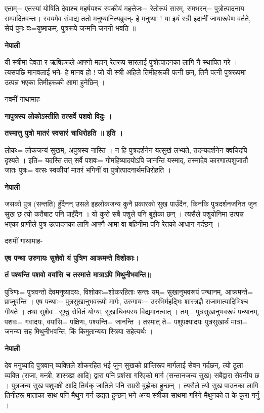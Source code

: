 \documentclass[11pt, a5paper]{article}
\begin{document}
एताम्= एतस्यां योषिति देवाश्च महर्षयश्च स्वकीयं महत्तेजः= रेतोरूपं सारम्, समभरन्= पुत्रोत्पादनाय सम्पादितवन्तः। स्वयमेव संपाद्य ततो मनुष्यानित्यब्रुवन्- हे मनुष्याः ! या इयं स्त्री इदानीं जायारूपेण वर्तते, सेयं पुनः वः=युष्माकम्, पुत्ररूपे जन्मनि जननी भवति ॥

\textbf{नेपाली}

यी स्त्रीमा देवता र ऋषिहरूले आफ्नो महान् रेतरूप सारलाई पुत्रोत्पादनका लागि नै स्थापित गरे । त्यसपछि मानवलाई भने- हे मानव हो ! जो यी स्त्री अहिले तिमीहरूकी पत्नी छन्, तिनै पत्नी पुत्ररूपमा उत्पन्न भएका तिमीहरूकी आमा हुनेछिन् ।

नवमीं गाथामाह-

\textbf{नापुत्रस्य लोकोऽस्तीति तत्सर्वे पशवो विदुः ।}

\textbf{तस्मात्तु पुत्रो मातरं स्वसारं चाधिरोहति ॥ इति ।}

लोकः= लोकजन्यं सुखम्, अपुत्रस्य नास्ति । न हि पुत्रदर्शनेन यत्सुखं लभ्यते, तदन्यदर्शनेन क्वचिदपि दृश्यते । इति= यदस्ति तत् सर्वे पशवः= गोमहिष्यादयोऽपि जानन्ति यस्माद्, तस्मादेव कारणात्पशुजातौ जातः पुत्रः= वत्सः स्वकीयां मातरं भगिनीं वा पुत्रोत्पादनार्थमधिरोहति ।

\textbf{नेपाली}

जसको पुत्र (सन्तति) हुँदैनन् उसले इहलोकजन्य कुनै प्रकारको सुख पाउँदैन, किनकि पुत्रदर्शनजनित जुन सुख छ त्यो कतैबाट पनि पाइँदैन । यो कुरो सबै पशुले पनि बुझेका छन् । त्यसैले पशुयोनिमा उत्पन्न भएका प्राणीले पुत्र उत्पादनका लागि आफ्नै आमा वा बहिनीमा पनि रेतको आधान गर्दछन् ।

दशमीं गाथामाह-

\textbf{एष पन्था उरुगायः सुशेवो यं पुत्रिण आक्रमन्ते विशोकाः।}

\textbf{तं पश्यन्ति पशवो वयांसि च तस्मात्ते मात्राऽपि मिथुनीभवन्ति॥}

पुत्रिणः= पुत्रवन्तो देवमनुष्यादयः, विशोकाः=शोकरहिताः सन्तः यम्= सुखानुभवरूपं पन्थानम्, आक्रमन्ते= प्राप्नुवन्ति । एष पन्थाः= पुत्रसुखानुभवरूपो मार्गः, उरुगायः= उरुभिर्महद्भिः शास्त्रज्ञै राजामात्यादिभिश्च गीयते । तथा सुशेवः=सुष्ठु सेवितं योग्यः, सुखाधिक्यस्य विद्यमानत्वात् । तम्= पुत्रसुखानुभवरूपं पन्थानम्, पशवः= गवादयः, वयांसि= पक्षिणः, पश्यन्ति= जानन्ति । तस्मात् ते= पशुपक्ष्यादयः पुत्रसुखार्थं मात्रा= जनन्या सह मिथुनीभवन्ति, किं किमुतान्यया स्त्रिया सहेत्यर्थः ।

\textbf{नेपाली}

देव मनुष्यादि पुत्रवान् व्यक्तिले शोकरहित भई जुन सुखको प्राप्तिरूप मार्गलाई सेवन गर्दछन्, त्यो ठूला व्यक्ति (राजा, मन्त्री, शास्त्रज्ञ आदि) द्वारा पनि प्रशंसा गरिएको मार्ग (सन्तानजन्य सुख) सबैद्वारा सेवनीय छ । पुत्रजन्य सुख पशुपक्षी आदि तिर्यक् जातिले पनि राम्ररी बुझेका हुन्छन् । त्यसैले त्यो सुख पाउनका लागि तिनीहरू माताका साथ पनि मैथुन गर्न उद्यत हुन्छन् भने अन्य स्त्रीका साथमा  गरिने मैथुनको त के कुरा गर्नु ।
\end{document}
